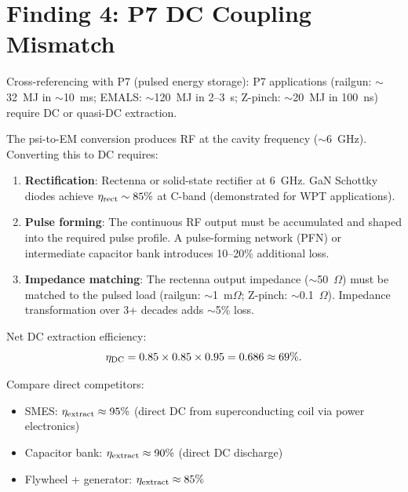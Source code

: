 \documentclass[11pt]{article}
\begin{document}
\section{Finding 4: P7 DC Coupling Mismatch}
\label{sec:p7-crosslink}

Cross-referencing with P7 (pulsed energy storage): P7 applications
(railgun: $\sim$32~MJ in $\sim$10~ms; EMALS: $\sim$120~MJ in 2--3~s;
Z-pinch: $\sim$20~MJ in 100~ns) require DC or quasi-DC extraction.

The psi-to-EM conversion produces RF at the cavity frequency ($\sim$6~GHz).
Converting this to DC requires:

\begin{enumerate}
\item \textbf{Rectification}: Rectenna or solid-state rectifier at 6~GHz.
  GaN Schottky diodes achieve $\eta_{\rm rect} \sim 85\%$ at C-band
  (demonstrated for WPT applications).

\item \textbf{Pulse forming}: The continuous RF output must be accumulated
  and shaped into the required pulse profile. A pulse-forming network
  (PFN) or intermediate capacitor bank introduces 10--20\% additional loss.

\item \textbf{Impedance matching}: The rectenna output impedance
  ($\sim$50~$\Omega$) must be matched to the pulsed load
  (railgun: $\sim$1~m$\Omega$; Z-pinch: $\sim$0.1~$\Omega$).
  Impedance transformation over 3+ decades adds $\sim$5\% loss.
\end{enumerate}

Net DC extraction efficiency:
\begin{equation}
\eta_{\rm DC} = 0.85 \times 0.85 \times 0.95 = 0.686 \approx 69\%.
\end{equation}

Compare direct competitors:
\begin{itemize}[nosep]
\item SMES: $\eta_{\rm extract} \approx 95\%$ (direct DC from superconducting
  coil via power electronics)
\item Capacitor bank: $\eta_{\rm extract} \approx 90\%$ (direct DC discharge)
\item Flywheel + generator: $\eta_{\rm extract} \approx 85\%$
\end{itemize}
\end{document}
